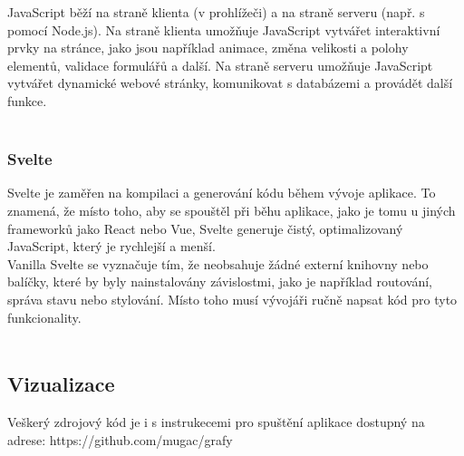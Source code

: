 \documentclass[12pt, titlepage, a4paper]{article}
\begin{document}
JavaScript běží na straně klienta (v prohlížeči) a na straně serveru (např. s pomocí Node.js). Na 
straně klienta umožňuje JavaScript vytvářet interaktivní prvky na stránce, jako jsou například 
animace, změna velikosti a polohy elementů, validace formulářů a další. Na straně serveru umožňuje 
JavaScript vytvářet dynamické webové stránky, komunikovat s databázemi a provádět další funkce.
\\

~\cite{Mozilla: JavaScript}
\subsubsection{Svelte}
Svelte je zaměřen na kompilaci a generování kódu během vývoje aplikace. To znamená, že místo toho, 
aby se spouštěl při běhu aplikace, jako je tomu u jiných frameworků jako React nebo Vue, Svelte 
generuje čistý, optimalizovaný JavaScript, který je rychlejší a menší.
\\

Vanilla Svelte se vyznačuje tím, že neobsahuje žádné externí knihovny nebo balíčky, které by 
byly nainstalovány závislostmi, jako je například routování, správa stavu nebo stylování. Místo 
toho musí vývojáři ručně napsat kód pro tyto funkcionality.
\\

~\cite{Svelte docs}
\clearpage
\subsection{Vizualizace}
Veškerý zdrojový kód je i s instrukecemi pro spuštění aplikace dostupný na adrese: https://github.com/mugac/grafy
\end{document}
